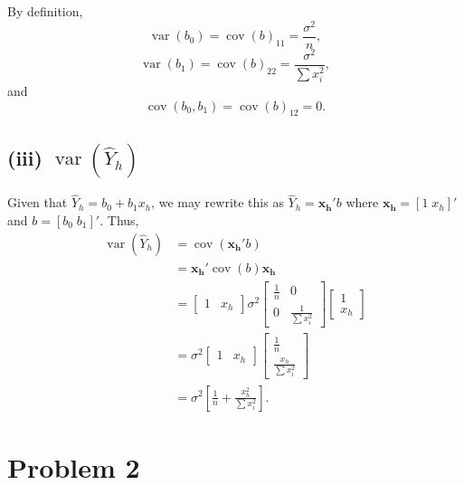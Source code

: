 \documentclass[
]{article}
\begin{document}
By definition, \[
  \operatorname{var}(b_0) = \operatorname{cov}(b)_{1 1} = \frac{\sigma^2}{n},
\] \[
  \operatorname{var}(b_1) = \operatorname{cov}(b)_{2 2} = \frac{\sigma^2}{\sum x_i^2},
\] and \[
  \operatorname{cov}(b_0,b_1) = \operatorname{cov}(b)_{1 2} = 0.
\]

\hypertarget{iii-operatornamevarhaty_h}{%
\subsection{\texorpdfstring{(iii)
\(\operatorname{var}(\hat{Y}_h)\)}{(iii) \textbackslash operatorname\{var\}(\textbackslash hat\{Y\}\_h)}}\label{iii-operatornamevarhaty_h}}

Given that \(\hat{Y}_h = b_0 + b_1 x_h\), we may rewrite this as
\(\hat{Y}_h = \symbf{x_h'} b\) where \(\symbf{x_h} = [1 \; x_h]'\) and
\(b = [b_0 \; b_1]'\). Thus, \begin{align*}
  \operatorname{var}(\hat{Y}_h)
    &= \operatorname{cov}(\symbf{x_h'} b)\\
    &= \symbf{x_h'} \operatorname{cov}(b) \symbf{x_h}\\
    &=
    \begin{bmatrix}
      1 & x_h
    \end{bmatrix}
    \sigma^2
    \begin{bmatrix}
      \frac{1}{n} & 0\\
      0           & \frac{1}{\sum x_i^2}
    \end{bmatrix}
    \begin{bmatrix}
      1\\
      x_h
    \end{bmatrix}\\
    &=
    \sigma^2
    \begin{bmatrix}
      1 & x_h
    \end{bmatrix}
    \begin{bmatrix}
      \frac{1}{n}\\
      \frac{x_h}{\sum x_i^2}
    \end{bmatrix}\\
    &=
    \sigma^2
    \left[
      \frac{1}{n} + \frac{x_h^2}{\sum x_i^2}
    \right].
\end{align*}

\hypertarget{problem-2}{%
\section{Problem 2}\label{problem-2}}
\end{document}
